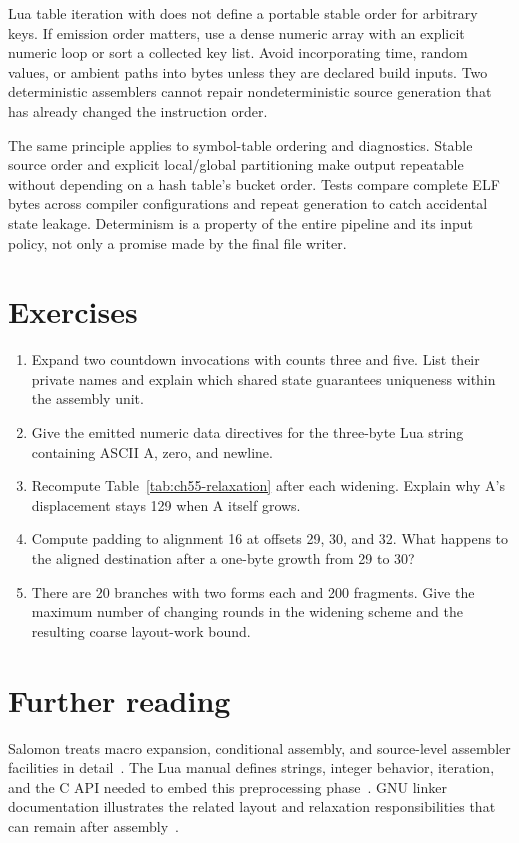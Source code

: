 Lua table iteration with  does not define a portable stable order for arbitrary keys.
If emission order matters, use a dense numeric array with an explicit numeric loop or sort a collected key list.
Avoid incorporating time, random values, or ambient paths into bytes unless they are declared build inputs.
Two deterministic assemblers cannot repair nondeterministic source generation that has already changed the instruction order.

The same principle applies to symbol-table ordering and diagnostics.
Stable source order and explicit local/global partitioning make output repeatable without depending on a hash table's bucket order.
Tests compare complete ELF bytes across compiler configurations and repeat generation to catch accidental state leakage.
Determinism is a property of the entire pipeline and its input policy, not only a promise made by the final file writer.

\section{Exercises}
\label{sec:ch55-exercises}
\begin{enumerate}
\item\label{ex:ch55-fresh} Expand two countdown invocations with counts three and five. List their private names and explain which shared state guarantees uniqueness within the assembly unit.
\item\label{ex:ch55-bytes} Give the emitted numeric data directives for the three-byte Lua string containing ASCII A, zero, and newline.
\item\label{ex:ch55-rounds} Recompute Table~\ref{tab:ch55-relaxation} after each widening. Explain why A's displacement stays 129 when A itself grows.
\item\label{ex:ch55-align} Compute padding to alignment 16 at offsets 29, 30, and 32. What happens to the aligned destination after a one-byte growth from 29 to 30?
\item\label{ex:ch55-bound} There are 20 branches with two forms each and 200 fragments. Give the maximum number of changing rounds in the widening scheme and the resulting coarse layout-work bound.
\end{enumerate}

\section{Further reading}
\label{sec:ch55-reading}
Salomon treats macro expansion, conditional assembly, and source-level assembler facilities in detail~\cite{salomon-1993-assemblers}.
The Lua manual defines strings, integer behavior, iteration, and the C API needed to embed this preprocessing phase~\cite{ierusalimschy-2026-lua}.
GNU linker documentation illustrates the related layout and relaxation responsibilities that can remain after assembly~\cite{gnu-2026-ld}.
